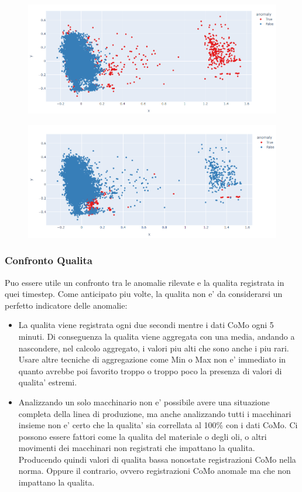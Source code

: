 \begin{figure}[t]
\includegraphics[width=14cm, scale=1]{images/kde_scatter}
\centering
\end{figure}




\begin{figure}[t]
\includegraphics[width=14cm, scale=1]{images/worst_clf_scatter}
\centering
\end{figure}

\subsubsection{Confronto Qualita}
Puo essere utile un confronto tra le anomalie rilevate e la qualita registrata in quei timestep. Come anticipato piu volte, la qualita non e' da considerarsi un perfetto indicatore delle anomalie: 
\begin{itemize}
\item La qualita viene registrata ogni due secondi mentre i dati CoMo ogni 5 minuti. Di conseguenza la qualita viene aggregata con una media, andando a nascondere, nel calcolo aggregato, i valori piu alti che sono anche i piu rari. Usare altre tecniche di aggregazione come Min o Max non e' immediato in quanto avrebbe poi favorito troppo o troppo poco la presenza di valori di qualita' estremi.
\item Analizzando un solo macchinario non e' possibile avere una situazione completa della linea di produzione, ma anche analizzando tutti i macchinari insieme non e' certo che la qualita' sia correllata al 100\% con i dati CoMo. Ci possono essere fattori come la qualita del materiale o degli oli, o altri movimenti dei macchinari non registrati che impattano la qualita. Producendo quindi valori di qualita bassa nonostate registrazioni CoMo nella norma. Oppure il contrario, ovvero registrazioni CoMo anomale ma che non impattano la qualita.
\end{itemize}

